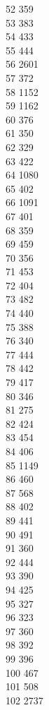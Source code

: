 { 52	359 \\
 53	383 \\
 54	433 \\
 55	444 \\
 56	2601 \\
 57	372 \\
 58	1152 \\
 59	1162 \\
 60	376 \\
 61	350 \\
 62	329 \\
 63	422 \\
 64	1080 \\
 65	402 \\
 66	1091 \\
 67	401 \\
 68	359 \\
 69	459 \\
 70	356 \\
 71	453 \\
 72	404 \\
 73	482 \\
 74	440 \\
 75	388 \\
 76	340 \\
 77	444 \\
 78	442 \\
 79	417 \\
 80	346 \\
 81	275 \\
 82	424 \\
 83	454 \\
 84	406 \\
 85	1149 \\
 86	460 \\
 87	568 \\
 88	402 \\
 89	441 \\
 90	491 \\
 91	360 \\
 92	444 \\
 93	390 \\
 94	425 \\
 95	327 \\
 96	323 \\
 97	360 \\
 98	392 \\
 99	396 \\
 100	467 \\
 101	508 \\
 102	2737 \\
}
